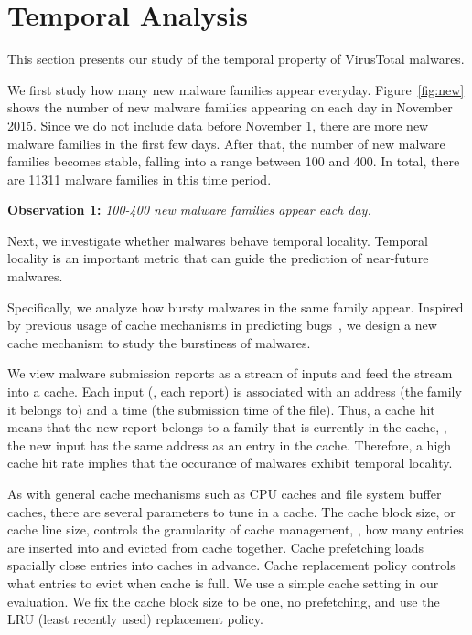 
\section{Temporal Analysis}
\label{sec:temporal}

This section presents our study of the temporal property of VirusTotal malwares. 



We first study how many new malware families appear everyday. 
Figure~\ref{fig:new} shows the number of new malware families appearing on each day in November 2015. 
Since we do not include data before November 1, 
there are more new malware families in the first few days.
After that, the number of new malware families becomes stable, 
falling into a range between 100 and 400. 
In total, there are 11311 malware families in this time period. 

{\bf Observation 1:} 
{\em 100-400 new malware families appear each day.}




Next, we investigate whether malwares behave temporal locality.
Temporal locality is an important metric that can guide the 
prediction of near-future malwares.

Specifically, we analyze how bursty malwares in the same family appear.  
Inspired by previous usage of cache mechanisms in predicting bugs~\cite{predicting},
we design a new cache mechanism to study the burstiness of malwares.

We view malware submission reports as a stream of inputs 
and feed the stream into a cache. 
Each input (\ie, each report) is associated with an address (the family it belongs to) and a time (the submission time of the file).
Thus, a cache hit means that the new report belongs to a family that is currently in the cache,
\ie, the new input has the same address as an entry in the cache.
Therefore, a high cache hit rate implies that the occurance of malwares exhibit temporal locality.

As with general cache mechanisms such as CPU caches and file system buffer caches, 
there are several parameters to tune in a cache.
The cache block size, or cache line size, controls the granularity of cache management, 
\ie, how many entries are inserted into and evicted from cache together.
Cache prefetching loads spacially close entries into caches in advance. 
Cache replacement policy controls what entries to evict when cache is full.
We use a simple cache setting in our evaluation. 
We fix the cache block size to be one, no prefetching, 
and use the LRU (least recently used) replacement policy.

